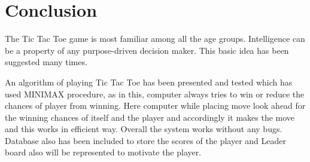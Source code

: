 \chapter{Conclusion}

The Tic Tac Toe game is most familiar among all the age groups. Intelligence can be a property of any purpose-driven decision maker. This basic idea has been suggested many times. 

\noindent
An algorithm of playing Tic Tac Toe has been presented and tested which has used MINIMAX procedure, as in this, computer always tries to win or reduce the chances of player from winning. Here computer while placing move look ahead for the winning chances of itself and the player and accordingly it makes the move  and this works in efficient way. Overall the system works without any bugs. Database also has been included to store the scores of the player and Leader board also will be represented to motivate the player. 